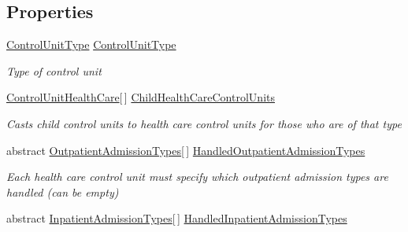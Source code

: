 \subsection*{Properties}
\begin{DoxyCompactItemize}
\item 
\hyperlink{namespace_enums_aeea01f7c2eb29cb3e9e88daa9732d231}{Control\+Unit\+Type} \hyperlink{class_general_health_care_elements_1_1_control_units_1_1_control_unit_health_care_a9d157887ee345892cce9defbc4da81ec}{Control\+Unit\+Type}
\begin{DoxyCompactList}\small\item\em Type of control unit \end{DoxyCompactList}\item 
\hyperlink{class_general_health_care_elements_1_1_control_units_1_1_control_unit_health_care}{Control\+Unit\+Health\+Care}\mbox{[}$\,$\mbox{]} \hyperlink{class_general_health_care_elements_1_1_control_units_1_1_control_unit_health_care_af0df1c8b2d9d10ee0217c750ab0b0567}{Child\+Health\+Care\+Control\+Units}
\begin{DoxyCompactList}\small\item\em Casts child control units to health care control units for those who are of that type \end{DoxyCompactList}\item 
abstract \hyperlink{class_general_health_care_elements_1_1_treatment_admission_types_1_1_outpatient_admission_types}{Outpatient\+Admission\+Types}\mbox{[}$\,$\mbox{]} \hyperlink{class_general_health_care_elements_1_1_control_units_1_1_control_unit_health_care_a0dfb9af132c58819511381ccc739ffbd}{Handled\+Outpatient\+Admission\+Types}
\begin{DoxyCompactList}\small\item\em Each health care control unit must specify which outpatient admission types are handled (can be empty) \end{DoxyCompactList}\item 
abstract \hyperlink{class_general_health_care_elements_1_1_treatment_admission_types_1_1_inpatient_admission_types}{Inpatient\+Admission\+Types}\mbox{[}$\,$\mbox{]} \hyperlink{class_general_health_care_elements_1_1_control_units_1_1_control_unit_health_care_afda052c6b7471c7d56be7f96b38f793f}{Handled\+Inpatient\+Admission\+Types}

\end{DoxyCompactItemize}
